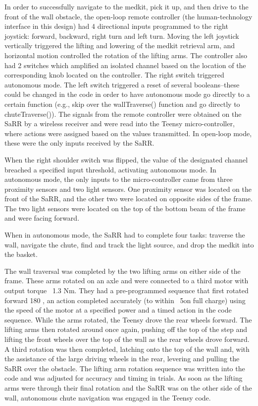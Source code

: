 In order to successfully navigate to the medkit, pick it up, and then drive to the front of the wall obstacle, the open-loop remote controller (the human-technology interface in this design) had 4 directional inputs programmed to the right joystick: forward, backward, right turn and left turn. Moving the left joystick vertically triggered the lifting and lowering of the medkit retrieval arm, and horizontal motion controlled the rotation of the lifting arms. The controller also had 2 switches which amplified an isolated channel based on the location of the corresponding knob located on the controller. The right switch triggered autonomous mode. The left switch triggered a reset of several booleans--these could be changed in the code in order to have autonomous mode go directly to a certain function (e.g., skip over the wallTraverse() function and go directly to chuteTraverse()). The signals from the remote controller were obtained on the SaRR by a wireless receiver and were read into the Teensy micro-controller, where actions were assigned based on the values transmitted. In open-loop mode, these were the only inputs received by the SaRR.

When the right shoulder switch was flipped, the value of the designated channel breached a specified input threshold, activating autonomous mode. In autonomous mode, the only inputs to the micro-controller came from three proximity sensors and two light sensors. One proximity sensor was located on the front of the SaRR, and the other two were located on opposite sides of the frame. The two light sensors were located on the top of the bottom beam of the frame and were facing forward. 

When in autonomous mode, the SaRR had to complete four tasks: traverse the wall, navigate the chute, find and track the light source, and drop the medkit into the basket. 

The wall traversal was completed by the two lifting arms on either side of the frame. These arms rotated on an axle and were connected to a third motor with output torque ~1.3 Nm. They had a pre-programmed sequence that first rotated forward 180 \degree, an action completed accurately (to within ~5\degree on full charge) using the speed of the motor at a specified power and a timed action in the code sequence. While the arms rotated, the Teensy drove the rear wheels forward. The lifting arms then rotated around once again, pushing off the top of the step and lifting the front wheels over the top of the wall as the rear wheels drove forward. A third rotation was then completed, latching onto the top of the wall and, with the assistance of the large driving wheels in the rear, levering and pulling the SaRR over the obstacle. The lifting arm rotation sequence was written into the code and was adjusted for accuracy and timing in trials. As soon as the lifting arms were through their final rotation and the SaRR was on the other side of the wall, autonomous chute navigation was engaged in the Teensy code.

